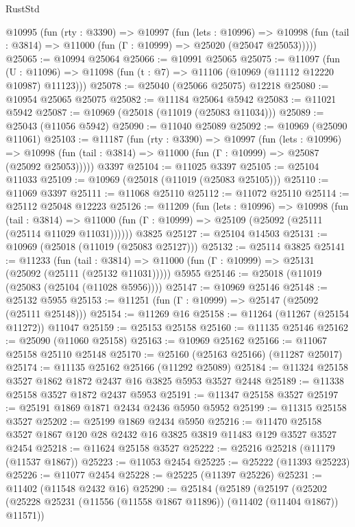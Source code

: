 \begin{lexlean}{RustStd}
\begin{coremodule}
  @10995
    (fun (rty : @3390) =>
    @10997
      (fun (lets : @10996) =>
      @10998 (fun (tail : @3814) => @11000 (fun (Γ : @10999) => @25020 (@25047 @25053)))))
@25065 := @10994 @25064
@25066 := @10991 @25065
@25075 := @11097
    (fun (U : @11096) => @11098 (fun (t : @7) => @11106 (@10969 (@11112 @12220 @10987) @11123)))
@25078 := @25040 (@25066 @25075) @12218
@25080 := @10954 @25065 @25075
@25082 := @11184 @25064 @5942
@25083 := @11021 @5942
@25087 := @10969 (@25018 (@11019 (@25083 @11034)))
@25089 := @25043 (@11056 @5942)
@25090 := @11040 @25089
@25092 := @10969 (@25090 @11061)
@25103 := @11187
    (fun (rty : @3390) =>
    @10997
      (fun (lets : @10996) =>
      @10998 (fun (tail : @3814) => @11000 (fun (Γ : @10999) => @25087 (@25092 @25053)))))
    @3397
@25104 := @11025 @3397
@25105 := @25104 @11033
@25109 := @10969 (@25018 (@11019 (@25083 @25105)))
@25110 := @11069 @3397
@25111 := @11068 @25110
@25112 := @11072 @25110
@25114 := @25112 @25048 @12223
@25126 := @11209
    (fun (lets : @10996) =>
    @10998
      (fun (tail : @3814) =>
      @11000 (fun (Γ : @10999) => @25109 (@25092 (@25111 (@25114 @11029 @11031))))))
    @3825
@25127 := @25104 @14503
@25131 := @10969 (@25018 (@11019 (@25083 @25127)))
@25132 := @25114 @3825
@25141 := @11233
    (fun (tail : @3814) => @11000 (fun (Γ : @10999) => @25131 (@25092 (@25111 (@25132 @11031)))))
    @5955
@25146 := @25018 (@11019 (@25083 (@25104 (@11028 @5956))))
@25147 := @10969 @25146
@25148 := @25132 @5955
@25153 := @11251 (fun (Γ : @10999) => @25147 (@25092 (@25111 @25148)))
@25154 := @11269 @16
@25158 := @11264 (@11267 (@25154 @11272)) @11047
@25159 := @25153 @25158
@25160 := @11135 @25146
@25162 := @25090 (@11060 @25158)
@25163 := @10969 @25162
@25166 := @11067 @25158 @25110 @25148
@25170 := @25160 (@25163 @25166) (@11287 @25017)
@25174 := @11135 @25162 @25166 (@11292 @25089)
@25184 := @11324 @25158 @3527 @1862 @1872 @2437 @16 @3825 @5953 @3527 @2448
@25189 := @11338 @25158 @3527 @1872 @2437 @5953
@25191 := @11347 @25158 @3527
@25197 := @25191 @1869 @1871 @2434 @2436 @5950 @5952
@25199 := @11315 @25158 @3527
@25202 := @25199 @1869 @2434 @5950
@25216 := @11470 @25158 @3527 @1867 @120 @28 @2432 @16 @3825 @3819 @11483 @129 @3527 @3527 @2454
@25218 := @11624 @25158 @3527
@25222 := @25216 @25218 (@11179 (@11537 @1867))
@25223 := @11053 @2454
@25225 := @25222 (@11393 @25223)
@25226 := @11077 @2454
@25228 := @25225 (@11397 @25226)
@25231 := @11402 (@11548 @2432 @16)
@25290 := @25184
    (@25189
      (@25197
        (@25202 (@25228 @25231 (@11556 (@11558 @1867 @11896)) (@11402 (@11404 @1867)) @11571))

\end{coremodule}
\end{lexlean}
